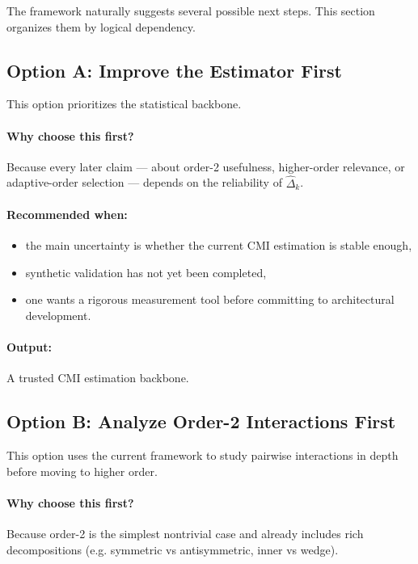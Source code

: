 \documentclass[11pt]{article}
\newcommand{\1}{\mathbf{1}}
\begin{document}
The framework naturally suggests several possible next steps. This section organizes them by logical
dependency.

\subsection{Option A: Improve the Estimator First}

This option prioritizes the statistical backbone.

\paragraph{Why choose this first?}
Because every later claim --- about order-2 usefulness, higher-order relevance, or adaptive-order
selection --- depends on the reliability of $\widehat{\Delta}_k$.

\paragraph{Recommended when:}
\begin{itemize}[leftmargin=1.5em]
    \item the main uncertainty is whether the current CMI estimation is stable enough,
    \item synthetic validation has not yet been completed,
    \item one wants a rigorous measurement tool before committing to architectural development.
\end{itemize}

\paragraph{Output:}
A trusted CMI estimation backbone.

\subsection{Option B: Analyze Order-2 Interactions First}

This option uses the current framework to study pairwise interactions in depth before moving to
higher order.

\paragraph{Why choose this first?}
Because order-2 is the simplest nontrivial case and already includes rich decompositions
(e.g. symmetric vs antisymmetric, inner vs wedge).
\end{document}
